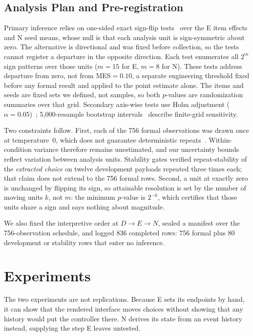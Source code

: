 \documentclass[sigconf]{acmart}
\begin{document}
\subsection{Analysis Plan and Pre-registration}
Primary inference relies on one-sided exact sign-flip tests~\cite{ernst2004permutation} over the E item effects and N seed means, whose null is that each analysis unit is sign-symmetric about zero. The alternative is directional and was fixed before collection, so the tests cannot register a departure in the opposite direction. Each test enumerates all $2^m$ sign patterns over those units ($m{=}15$ for E, $m{=}8$ for N). These tests address departure from zero, not from MES${=}0.10$, a separate engineering threshold fixed before any formal result and applied to the point estimate alone. The items and seeds are fixed sets we defined, not samples, so both $p$-values are randomization summaries over that grid. Secondary axis-wise tests use Holm adjustment ($\alpha{=}0.05$)~\cite{holm1979simple}; 5{,}000-resample bootstrap intervals~\cite{efron1979bootstrap} describe finite-grid sensitivity.

Two constraints follow. First, each of the 756 formal observations was drawn once at temperature~$0$, which does not guarantee deterministic repeats~\cite{ouyang2025nondeterminism}. Within-condition variance therefore remains unestimated, and our uncertainty bounds reflect variation between analysis units. Stability gates verified repeat-stability of the \emph{extracted choice} on twelve development payloads repeated three times each; that claim does not extend to the 756 formal rows. Second, a unit at exactly zero is unchanged by flipping its sign, so attainable resolution is set by the number of moving units $k$, not $m$: the minimum $p$-value is $2^{-k}$, which certifies that those units share a sign and says nothing about magnitude.

We also fixed the interpretive order at $D\rightarrow E\rightarrow N$, sealed a manifest over the 756-observation schedule, and logged 836 completed rows: 756 formal plus 80 development or stability rows that enter no inference.

\section{Experiments}

The two experiments are not replications. Because E sets its endpoints by hand, it can show that the rendered interface moves choices without showing that any history would put the controller there. N derives its state from an event history instead, supplying the step E leaves untested.
\end{document}
